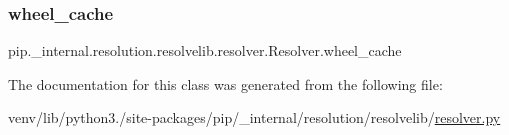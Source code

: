 \subsubsection{\texorpdfstring{wheel\+\_\+cache}{wheel\_cache}}
{\footnotesize\ttfamily pip.\+\_\+internal.\+resolution.\+resolvelib.\+resolver.\+Resolver.\+wheel\+\_\+cache\hspace{0.3cm}{\ttfamily [static]}}



The documentation for this class was generated from the following file\+:\begin{DoxyCompactItemize}
\item 
venv/lib/python3./site-\/packages/pip/\+\_\+internal/resolution/resolvelib/\hyperlink{resolvelib_2resolver_8py}{resolver.\+py}\end{DoxyCompactItemize}
